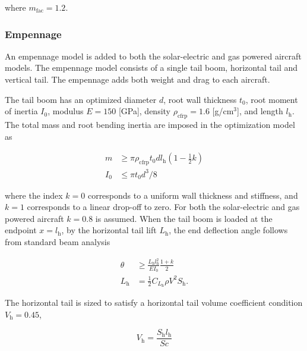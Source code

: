 where $m_{\text{fac}} = 1.2$.


\subsubsection{Empennage}

An empennage model is added to both the solar-electric and gas powered aircraft models.  The empennage model consists of a single tail boom, horizontal tail and vertical tail.  
The empennage adds both weight and drag to each aircraft.  

The tail boom has an optimized diameter $d$, root wall thickness $t_0$, root moment of inertia $I_0$, modulus $E=150$ [GPa]\cite{cfprop}, density $\rho_{\text{cfrp}} = 1.6$ [g/cm$^3$]\cite{cfprop}, and length $l_{\text{h}}$. 
The total mass and root bending inertia are imposed in the optimization model as 

\begin{align}
    m &\geq \pi \rho_{\text{cfrp}} t_0 d l_{\text{h}} \left( 1 - \frac{1}{2} k\right) \\
    I_0 &\leq \pi t_0 d^3/8
\end{align}

where the index $k=0$ corresponds to a uniform wall thickness and stiffness, and $k=1$ corresponds to a linear drop-off to zero.  For both the solar-electric and gas powered aircraft $k=0.8$ is assumed.  
When the tail boom is loaded at the endpoint $x=l_{\text{h}}$, by the horizontal tail lift $L_{\text{h}}$, the end deflection angle follows from standard beam analysis

\begin{align}
    \label{e:boomdefl}
    \theta &\geq \frac{L_{\text{h}} l_{\text{h}}^2}{EI_0} \frac{1+k}{2} \\
    L_{\text{h}} &= \frac{1}{2} C_{L_{\text{h}}} \rho V^2 S_{\text{h}}.
\end{align}

The horizontal tail is sized to satisfy a horizontal tail volume coefficient condition $V_{\text{h}} = 0.45$,\cite{aircraftrules}

\begin{equation}
    V_{\text{h}} = \frac{S_{\text{h}}l_{\text{h}}}{Sc}
\end{equation}

